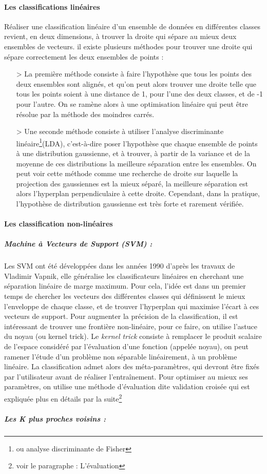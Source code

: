 \documentclass[a4paper,10pt]{report}
\begin{document}
\paragraph{Les classifications linéaires\\}
Réaliser une classification linéaire d'un ensemble de données en différentes classes revient, en deux dimensions, à trouver la droite qui sépare au mieux deux ensembles de vecteurs.
il existe plusieurs méthodes pour trouver une droite qui sépare correctement les deux ensembles de points :
\begin{itemize}
  \item[>] La première méthode consiste à faire l'hypothèse que tous les points des deux ensembles sont alignés, et qu'on peut alors trouver une droite telle que tous les points soient à une distance de 1, pour l'une des deux classes, et de -1 pour l'autre. On se ramène alors à une optimisation linéaire qui peut être résolue par la méthode des moindres carrés.
  \item[>] Une seconde méthode consiste à utiliser l'analyse discriminante linéaire\footnote{ou analyse discriminante de Fisher}(LDA), c'est-à-dire poser l'hypothèse que chaque ensemble de points à une distribution gaussienne, et à trouver, à partir de la variance et de la moyenne de ces distributions la meilleure séparation entre les ensembles. On peut voir cette méthode comme une recherche de droite sur laquelle la projection des gaussiennes est la mieux séparé, la meilleure séparation est alors l'hyperplan perpendiculaire à cette droite. Cependant, dans la pratique, l'hypothèse de distribution gaussienne est très forte et rarement vérifiée.
\end{itemize}
\paragraph{Les classification non-linéaires}
\subparagraph{Machine à Vecteurs de Support (SVM) :}

Les SVM ont été développées dans les années 1990 d'après les travaux de Vladimir Vapnik, elle généralise les classificateurs linéaires en cherchant une séparation linéaire de marge maximum. Pour cela, l'idée est dans un premier temps de chercher les vecteurs des différentes classes qui définissent le mieux l'enveloppe de chaque classe, et de trouver l'hyperplan qui maximise l'écart à ces vecteurs de support.
Pour augmenter la précision de la classification, il est intéressant de trouver une frontière non-linéaire, pour ce faire, on utilise l'astuce du noyau (ou kernel trick). Le \textit{kernel trick}\cite{aizermanSVM} consiste à remplacer le produit scalaire de l'espace considéré par l'évaluation d'une fonction (appelée noyau), on peut ramener l'étude d'un problème non séparable linéairement, à un problème linéaire. La classification admet alors des méta-paramètres, qui devront être fixés par l'utilisateur avant de réaliser l'entraînement. Pour optimiser au mieux ses paramètres, on utilise une méthode d'évaluation dite validation croisée qui est expliquée plus en détails par la suite\footnote{voir le paragraphe : L'évaluation}
\subparagraph{Les K plus proches voisins :}
\end{document}
